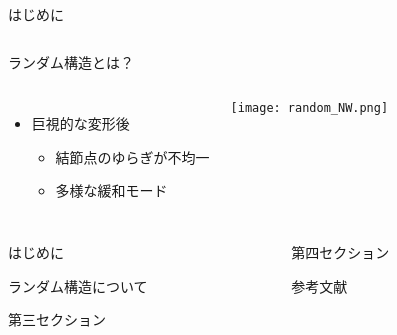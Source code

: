 \begin{frame}[t]{}
\begin{block}{はじめに}
\begin{columns}[T]
\begin{column}{.33\linewidth}
\begin{itembox}[l]{ランダム構造とは？}
\begin{columns}[totalwidth=.9\textwidth]
\begin{itemize}
										\item 巨視的な変形後
											\begin{itemize}
												\item 結節点のゆらぎが不均一
												\item 多様な緩和モード
											\end{itemize}
									\end{itemize}
								\texttt{[image: random\_NW.png]}
						\end{columns}
					\end{itembox}
				\end{column}
			\end{columns}
		\end{block}
		

		\begin{columns}[T]
			\begin{column}{.49\linewidth}
				\begin{block}{はじめに}
					
				\end{block}
				\begin{block}{ランダム構造について}
					
				\end{block}
				\begin{block}{第三セクション}
				\end{block}
				\end{column}
				\begin{column}{.49\linewidth}
				\begin{block}{第四セクション}
				\end{block}
				\begin{block}{参考文献}
					
				\end{block}
			\end{column}
		\end{columns}
		\end{frame}